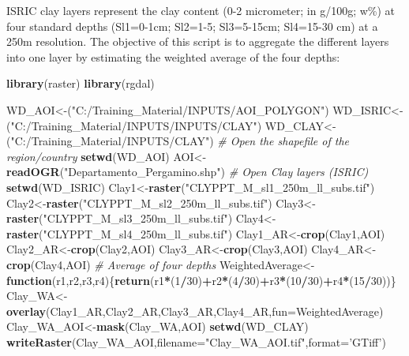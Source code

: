 \documentclass[
  10pt,
  b5paper,
]{book}
\newenvironment{Shaded}{\begin{snugshade}}{\end{snugshade}}
\newcommand{\CommentTok}[1]{\textcolor[rgb]{0.56,0.35,0.01}{\textit{#1}}}
\newcommand{\ControlFlowTok}[1]{\textcolor[rgb]{0.13,0.29,0.53}{\textbf{#1}}}
\newcommand{\DataTypeTok}[1]{\textcolor[rgb]{0.13,0.29,0.53}{#1}}
\newcommand{\DecValTok}[1]{\textcolor[rgb]{0.00,0.00,0.81}{#1}}
\newcommand{\KeywordTok}[1]{\textcolor[rgb]{0.13,0.29,0.53}{\textbf{#1}}}
\newcommand{\NormalTok}[1]{#1}
\newcommand{\OperatorTok}[1]{\textcolor[rgb]{0.81,0.36,0.00}{\textbf{#1}}}
\newcommand{\StringTok}[1]{\textcolor[rgb]{0.31,0.60,0.02}{#1}}
\begin{document}
ISRIC clay layers represent the clay content (0-2 micrometer; in g/100g; w\%) at four standard depths (Sl1=0-1cm; Sl2=1-5; Sl3=5-15cm; Sl4=15-30 cm) at a 250m resolution. The objective of this script is to aggregate the different layers into one layer by estimating the weighted average of the four depths:

\begin{Shaded}
\begin{Highlighting}[]
\KeywordTok{library}\NormalTok{(raster)}
\KeywordTok{library}\NormalTok{(rgdal)}

\NormalTok{WD_AOI<-(}\StringTok{"C:/Training_Material/INPUTS/AOI_POLYGON"}\NormalTok{)}
\NormalTok{WD_ISRIC<-(}\StringTok{"C:/Training_Material/INPUTS/INPUTS/CLAY"}\NormalTok{)}
\NormalTok{WD_CLAY<-(}\StringTok{"C:/Training_Material/INPUTS/CLAY"}\NormalTok{)}
\CommentTok{# Open the shapefile of the region/country}
\KeywordTok{setwd}\NormalTok{(WD_AOI)}
\NormalTok{AOI<-}\KeywordTok{readOGR}\NormalTok{(}\StringTok{"Departamento_Pergamino.shp"}\NormalTok{)}
\CommentTok{# Open Clay layers  (ISRIC)}
\KeywordTok{setwd}\NormalTok{(WD_ISRIC)}
\NormalTok{Clay1<-}\KeywordTok{raster}\NormalTok{(}\StringTok{"CLYPPT_M_sl1_250m_ll_subs.tif"}\NormalTok{)}
\NormalTok{Clay2<-}\KeywordTok{raster}\NormalTok{(}\StringTok{"CLYPPT_M_sl2_250m_ll_subs.tif"}\NormalTok{)}
\NormalTok{Clay3<-}\KeywordTok{raster}\NormalTok{(}\StringTok{"CLYPPT_M_sl3_250m_ll_subs.tif"}\NormalTok{)}
\NormalTok{Clay4<-}\KeywordTok{raster}\NormalTok{(}\StringTok{"CLYPPT_M_sl4_250m_ll_subs.tif"}\NormalTok{)}
\NormalTok{Clay1_AR<-}\KeywordTok{crop}\NormalTok{(Clay1,AOI)}
\NormalTok{Clay2_AR<-}\KeywordTok{crop}\NormalTok{(Clay2,AOI)}
\NormalTok{Clay3_AR<-}\KeywordTok{crop}\NormalTok{(Clay3,AOI)}
\NormalTok{Clay4_AR<-}\KeywordTok{crop}\NormalTok{(Clay4,AOI)}
\CommentTok{# Average of four depths }
\NormalTok{WeightedAverage<-}\ControlFlowTok{function}\NormalTok{(r1,r2,r3,r4)\{}\KeywordTok{return}\NormalTok{(r1}\OperatorTok{*}\NormalTok{(}\DecValTok{1}\OperatorTok{/}\DecValTok{30}\NormalTok{)}\OperatorTok{+}\NormalTok{r2}\OperatorTok{*}\NormalTok{(}\DecValTok{4}\OperatorTok{/}\DecValTok{30}\NormalTok{)}\OperatorTok{+}\NormalTok{r3}\OperatorTok{*}\NormalTok{(}\DecValTok{10}\OperatorTok{/}\DecValTok{30}\NormalTok{)}\OperatorTok{+}\NormalTok{r4}\OperatorTok{*}\NormalTok{(}\DecValTok{15}\OperatorTok{/}\DecValTok{30}\NormalTok{))\}}
\NormalTok{Clay_WA<-}\KeywordTok{overlay}\NormalTok{(Clay1_AR,Clay2_AR,Clay3_AR,Clay4_AR,}\DataTypeTok{fun=}\NormalTok{WeightedAverage)}
\NormalTok{Clay_WA_AOI<-}\KeywordTok{mask}\NormalTok{(Clay_WA,AOI)}
\KeywordTok{setwd}\NormalTok{(WD_CLAY)}
\KeywordTok{writeRaster}\NormalTok{(Clay_WA_AOI,}\DataTypeTok{filename=}\StringTok{"Clay_WA_AOI.tif"}\NormalTok{,}\DataTypeTok{format=}\StringTok{'GTiff'}\NormalTok{)}
\end{Highlighting}
\end{Shaded}
\end{document}
